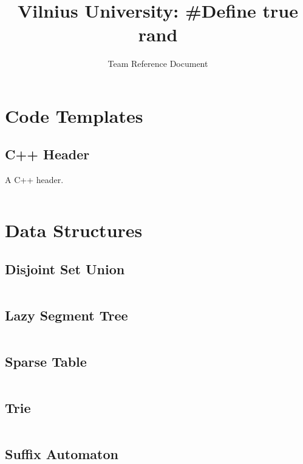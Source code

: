 \documentclass[8pt,a4paper,landscape,oneside]{amsart}
\title{Vilnius University: \#Define true rand}
\subtitle{Team Reference Document}
\date{\ddmmyyyydate{\today{}}}
\newcommand{\code}[1]{\inputminted[fontsize=\normalsize,baselinestretch=1]{cpp}{_code/#1}}
\begin{document}
\begin{multicols*}{3}
\maketitle
\thispagestyle{fancy}
\vspace{-3em}
\tableofcontents



\section{Code Templates}

    \subsection{C++ Header}
        A C++ header.
        \code{header.cpp}

\section{Data Structures}

	\subsection{Disjoint Set Union}
	
	\code{data-structures/dsu.cpp}
	
	\subsection{Lazy Segment Tree}
	
	\code{data-structures/lazy_segment_tree.cpp}
	
	\subsection{Sparse Table}
	
	\code{data-structures/sparse_table.cpp}
	
	\subsection{Trie}
	
	\code{data-structures/trie.cpp}
	
	\subsection{Suffix Automaton}
	

\end{multicols*}
\end{document}
